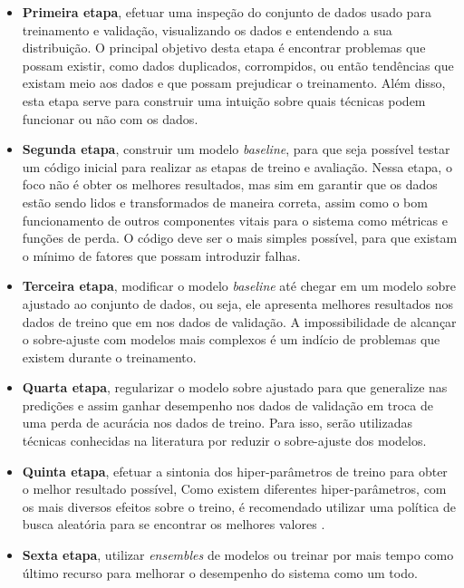 \begin{itemize}
\item 
\textbf{Primeira etapa}, efetuar uma inspeção do conjunto de dados usado para treinamento e validação, visualizando os dados e entendendo a sua distribuição. 
O principal objetivo desta etapa é encontrar problemas que possam existir, como dados duplicados, corrompidos, ou então tendências que existam meio aos dados e que possam prejudicar o treinamento. Além disso, esta etapa serve para construir uma intuição sobre quais técnicas podem funcionar ou não com os dados.
\item 
\textbf{Segunda etapa}, construir um modelo \textit{baseline}, para que seja possível testar um código inicial para realizar as etapas de treino e avaliação. 
Nessa etapa, o foco não é obter os melhores resultados, mas sim em garantir que os dados estão sendo lidos e transformados de maneira correta, assim como o bom funcionamento de outros componentes vitais para o sistema como métricas e funções de perda. O código deve ser o mais simples possível, para que existam o mínimo de fatores que possam introduzir falhas.
\item 
\textbf{Terceira etapa}, modificar o  modelo \textit{baseline} até chegar em um modelo sobre ajustado ao conjunto de dados, ou seja, ele apresenta melhores resultados nos dados de treino que em nos dados de validação. 
A impossibilidade de alcançar o sobre-ajuste com modelos mais complexos é um indício de problemas que existem durante o treinamento.
\item 
\textbf{Quarta etapa}, regularizar o modelo sobre ajustado para que generalize nas predições e assim ganhar desempenho nos dados de validação em troca de uma perda de acurácia nos dados de treino. 
Para isso, serão utilizadas técnicas conhecidas na literatura por reduzir o sobre-ajuste dos modelos.
\item 
\textbf{Quinta etapa}, efetuar a sintonia dos hiper-parâmetros de treino para obter o melhor resultado possível, 
Como existem diferentes hiper-parâmetros, com os mais diversos efeitos sobre o treino, 
é recomendado utilizar uma política de busca aleatória para se encontrar os melhores valores \cite{BergstraAndBengio:2012}.
\item 
\textbf{Sexta etapa}, utilizar \textit{ensembles} de modelos ou treinar por mais tempo como último recurso para melhorar o desempenho do sistema como um todo.
\end{itemize}